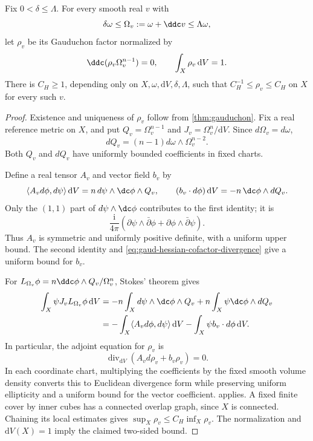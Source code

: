 \begin{proposition}\label{prop:gaud-hessian-factor-bounds}
Fix $0<\delta\leq\Lambda$. For every smooth real $v$ with
\[
 \delta\omega\leq\Omega_v:=\omega+\ddc v\leq\Lambda\omega,
\]
let $\rho_v$ be its Gauduchon factor normalized by
\[
 \ddc(\rho_v\Omega_v^{n-1})=0,
 \qquad \int_X\rho_v\,\mathrm{d}V=1.
\]
There is $C_H\geq1$, depending only on $X,\omega,\mathrm{d}V,\delta,\Lambda$, such that $C_H^{-1}\leq\rho_v\leq C_H$ on $X$ for every such $v$.
\end{proposition}
\begin{proof}
Existence and uniqueness of $\rho_v$ follow from \cref{thm:gauduchon}. Fix a real reference metric on $X$, and put $Q_v=\Omega_v^{n-1}$ and $J_v=\Omega_v^n/\mathrm{d}V$. Since $d\Omega_v=d\omega$,
\begin{equation}\label{eq:gaud-hessian-cofactor-divergence}
 dQ_v=(n-1)d\omega\wedge\Omega_v^{n-2}.
\end{equation}
Both $Q_v$ and $dQ_v$ have uniformly bounded coefficients in fixed charts.

Define a real tensor $A_v$ and vector field $b_v$ by
\[
 \langle A_vd\phi,d\psi\rangle\,\mathrm{d}V
       =n\,d\psi\wedge\dc\phi\wedge Q_v,
 \qquad
 (b_v\cdot d\phi)\,\mathrm{d}V
       =-n\,\dc\phi\wedge dQ_v.
\]
Only the $(1,1)$ part of $d\psi\wedge\dc\phi$ contributes to the first identity; it is
\[
 \frac{\mathrm i}{4\pi}
 (\partial\psi\wedge\bar\partial\phi
       +\partial\phi\wedge\bar\partial\psi).
\]
Thus $A_v$ is symmetric and uniformly positive definite, with a uniform upper bound. The second identity and \eqref{eq:gaud-hessian-cofactor-divergence} give a uniform bound for $b_v$.

For $L_{\Omega_v}\phi=n\ddc\phi\wedge Q_v/\Omega_v^n$, Stokes' theorem gives
\begin{align*}
 \int_X\psi J_vL_{\Omega_v}\phi\,\mathrm{d}V
 &=-n\int_Xd\psi\wedge\dc\phi\wedge Q_v
          +n\int_X\psi\dc\phi\wedge dQ_v\\
 &=-\int_X\langle A_vd\phi,d\psi\rangle\,\mathrm{d}V
          -\int_X\psi b_v\cdot d\phi\,\mathrm{d}V.
\end{align*}
In particular, the adjoint equation for $\rho_v$ is
\[
 \operatorname{div}_{\mathrm{d}V}(A_vd\rho_v+b_v\rho_v)=0.
\]
In each coordinate chart, multiplying the coefficients by the fixed smooth volume density converts this to Euclidean divergence form while preserving uniform ellipticity and a uniform bound for the vector coefficient.  applies. A fixed finite cover by inner cubes has a connected overlap graph, since $X$ is connected. Chaining its local estimates gives $\sup_X\rho_v\leq C_H\inf_X\rho_v$. The normalization and $\mathrm{d}V(X)=1$ imply the claimed two-sided bound.
\end{proof}

